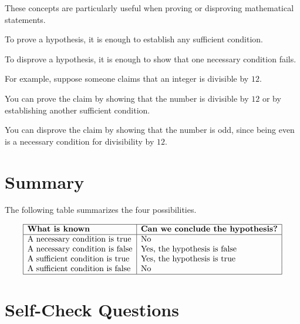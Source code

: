 \documentclass{essay}
\begin{document}
These concepts are particularly useful when proving or disproving mathematical statements.

To prove a hypothesis, it is enough to establish any sufficient condition.

To disprove a hypothesis, it is enough to show that one necessary condition fails.

For example, suppose someone claims that an integer is divisible by $12$.

You can prove the claim by showing that the number is divisible by $12$ or by establishing another sufficient condition.

You can disprove the claim by showing that the number is odd, since being even is a necessary condition for divisibility by $12$.

\section*{Summary}

The following table summarizes the four possibilities.

\[
\begin{array}{|l|l|}
\hline
\textbf{What is known} & \textbf{Can we conclude the hypothesis?} \\
\hline
\text{A necessary condition is true} & \text{No} \\
\text{A necessary condition is false} & \text{Yes, the hypothesis is false} \\
\text{A sufficient condition is true} & \text{Yes, the hypothesis is true} \\
\text{A sufficient condition is false} & \text{No} \\
\hline
\end{array}
\]

\section*{Self-Check Questions}
\end{document}
